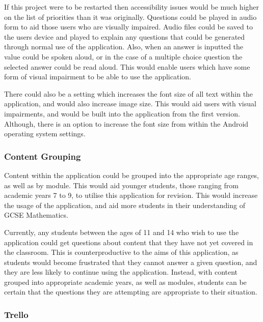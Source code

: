 \documentclass{article}
\begin{document}
If this project were to be restarted then accessibility issues would be much higher on the list of priorities than it was originally. Questions could be played in audio form to aid those users who are visually impaired. Audio files could be saved to the users device and played to explain any questions that could be generated through normal use of the application. Also, when an answer is inputted the value could be spoken aloud, or in the case of a multiple choice question the selected answer could be read aloud. This would enable users which have some form of visual impairment to be able to use the application. \par

There could also be a setting which increases the font size of all text within the application, and would also increase image size. This would aid users with visual impairments, and would be built into the application from the first version. Although, there is an option to increase the font size from within the Android operating system settings. \par

\subsubsection{Content Grouping}

Content within the application could be grouped into the appropriate age ranges, as well as by module. This would aid younger students, those ranging from academic years 7 to 9, to utilise this application for revision. This would increase the usage of the application, and aid more students in their understanding of GCSE Mathematics. \par

Currently, any students between the ages of 11 and 14 who wish to use the application could get questions about content that they have not yet covered in the classroom. This is counterproductive to the aims of this application, as students would become frustrated that they cannot answer a given question, and they are less likely to continue using the application. Instead, with content grouped into appropriate academic years, as well as modules, students can be certain that the questions they are attempting are appropriate to their situation. \par

\subsubsection{Trello}
\end{document}
